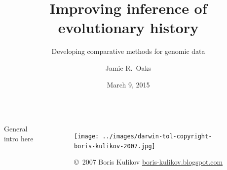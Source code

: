

\newcommand{\allParameters}[1]{\ensuremath{\theta_{#1}}\xspace}


\title[Improving inference of evolutionary history]{Improving inference of evolutionary history}
\subtitle{Developing comparative methods for genomic data}

\author[J.\ Oaks]{
    Jamie R.\ Oaks
}

\date{March 9, 2015}



\maketitle


\begin{frame}
    \begin{columns}[c]
        
        General intro here
        

        \begin{figure}
            \begin{center}
            \texttt{[image: ../images/darwin-tol-copyright-boris-kulikov-2007.jpg]}
            \caption{\tiny \copyright~2007 Boris Kulikov \href{http://boris-kulikov.blogspot.com/}{boris-kulikov.blogspot.com}}
            \end{center}
        \end{figure}
    \end{columns}
\end{frame}

